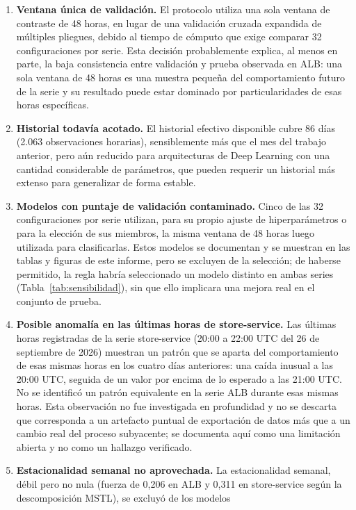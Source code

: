 \begin{enumerate}
  \item \textbf{Ventana única de validación.} El protocolo utiliza una sola ventana de contraste de 48
  horas, en lugar de una validación cruzada expandida de múltiples pliegues, debido al tiempo de cómputo
  que exige comparar 32 configuraciones por serie. Esta decisión probablemente explica, al menos en parte,
  la baja consistencia entre validación y prueba observada en ALB: una sola ventana de 48 horas es una
  muestra pequeña del comportamiento futuro de la serie y su resultado puede estar dominado por
  particularidades de esas horas específicas.
  \item \textbf{Historial todavía acotado.} El historial efectivo disponible cubre 86 días (2.063
  observaciones horarias), sensiblemente más que el mes del trabajo anterior, pero aún reducido para
  arquitecturas de Deep Learning con una cantidad considerable de parámetros, que pueden requerir un
  historial más extenso para generalizar de forma estable.
  \item \textbf{Modelos con puntaje de validación contaminado.} Cinco de las 32 configuraciones por serie
  utilizan, para su propio ajuste de hiperparámetros o para la elección de sus miembros, la misma ventana
  de 48 horas luego utilizada para clasificarlas. Estos modelos se documentan y se muestran en las tablas y
  figuras de este informe, pero se excluyen de la selección; de haberse permitido, la regla habría
  seleccionado un modelo distinto en ambas series (Tabla~\ref{tab:sensibilidad}), sin que ello implicara una
  mejora real en el conjunto de prueba.
  \item \textbf{Posible anomalía en las últimas horas de store-service.} Las últimas horas registradas de
  la serie store-service (20:00 a 22:00 UTC del 26 de septiembre de 2026) muestran un patrón que se aparta
  del comportamiento de esas mismas horas en los cuatro días anteriores: una caída inusual a las 20:00 UTC,
  seguida de un valor por encima de lo esperado a las 21:00 UTC. No se identificó un patrón equivalente en
  la serie ALB durante esas mismas horas. Esta observación no fue investigada en profundidad y no se
  descarta que corresponda a un artefacto puntual de exportación de datos más que a un cambio real del
  proceso subyacente; se documenta aquí como una limitación abierta y no como un hallazgo verificado.
  \item \textbf{Estacionalidad semanal no aprovechada.} La estacionalidad semanal, débil pero no nula
  (fuerza de 0,206 en ALB y 0,311 en store-service según la descomposición MSTL), se excluyó de los modelos

\end{enumerate}
